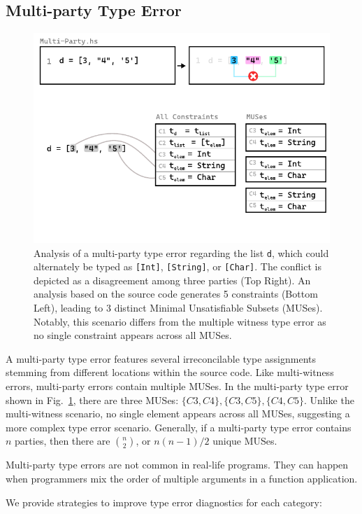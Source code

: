 \documentclass[pdflatex,lineno,sn-nature,Numbered]{sn-jnl}%
\begin{document}
\subsection{Multi-party Type Error} \label{sec:multi-party}

\begin{figure}[hbt]
  \centering
  \includegraphics[width=0.8\linewidth]{images/Multi-Party-MUS}
  \caption{\label{fig:multi-party-2} Analysis of a multi-party type error regarding the list \texttt{d}, which could alternately be typed as \texttt{[Int]}, \texttt{[String]}, or \texttt{[Char]}. The conflict is depicted as a disagreement among three parties (Top Right). An analysis based on the source code generates 5 constraints (Bottom Left), leading to 3 distinct Minimal Unsatisfiable Subsets (MUSes). Notably, this scenario differs from the multiple witness type error as no single constraint appears across all MUSes.}
  \end{figure}

  A multi-party type error features several irreconcilable type assignments stemming from different locations within the source code. Like multi-witness errors, multi-party errors contain multiple MUSes. In the multi-party type error shown in Fig.~\ref{fig:multi-party-2}, there are three MUSes: $\{C3, C4\}, \{C3, C5\}, \{C4, C5\}$. Unlike the multi-witness scenario, no single element appears across all MUSes, suggesting a more complex type error scenario. Generally, if a multi-party type error contains $n$ parties, then there are $\binom{n}{2}$, or $n (n - 1) / 2$ unique MUSes.
  
Multi-party type errors are not common in real-life programs. They can happen when programmers mix the order of multiple arguments in a function application.  
  
We provide strategies to improve type error diagnostics for each category:
\end{document}
